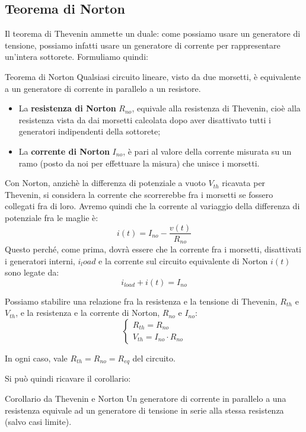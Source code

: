 \documentclass[a4paper,11pt]{article}
\begin{document}
\subsection{Teorema di Norton}
Il teorema di Thevenin ammette un duale: come possiamo usare un generatore di tensione, possiamo infatti usare un generatore di corrente per rappresentare un'intera sottorete.
Formuliamo quindi:
\begin{theorem}{Teorema di Norton}
	Qualsiasi circuito lineare, visto da due morsetti, è equivalente a un generatore di corrente in parallelo a un resistore.

\begin{itemize}
	\item La \textbf{resistenza di Norton} $R_{no}$, equivale alla resistenza di Thevenin, cioè alla resistenza vista da dai morsetti calcolata dopo aver disattivato tutti i generatori indipendenti della sottorete;
	\item La \textbf{corrente di Norton} $I_{no}$, è pari al valore della corrente misurata su un ramo (posto da noi per effettuare la misura) che unisce i morsetti.\end{itemize}
\end{theorem}

Con Norton, anzichè la differenza di potenziale a vuoto $V_{th}$ ricavata per Thevenin, si considera la corrente che scorrerebbe fra i morsetti se fossero collegati fra di loro.
Avremo quindi che la corrente al variaggio della differenza di potenziale fra le maglie è:
$$
i(t) = I_{no} - \frac{v(t)}{R_{no}}
$$
Questo perché, come prima, dovrà essere che la corrente fra i morsetti, disattivati i generatori interni, $i_load$ e la corrente sul circuito equivalente di Norton $i(t)$ sono legate da:
$$
i_{load} + i(t) = I_{no}
$$

\par\medskip 

Possiamo stabilire una relazione fra la resistenza e la tensione di Thevenin, $R_{th}$ e $V_{th}$, e la resistenza e la corrente di Norton, $R_{no}$ e $I_{no}$:
\[
	\begin{cases}
		R_{th} = R_{no} \\ 
		V_{th} = I_{no} \cdot R_{no}
	\end{cases}
\]

In ogni caso, vale $R_{th} = R_{no} = R_{eq}$ del circuito.

Si può quindi ricavare il corollario:
\begin{theorem}{Corollario da Thevenin e Norton}
	Un generatore di corrente in parallelo a una resistenza equivale ad un generatore di tensione in serie alla stessa resistenza (salvo casi limite).
\end{theorem}
\end{document}
